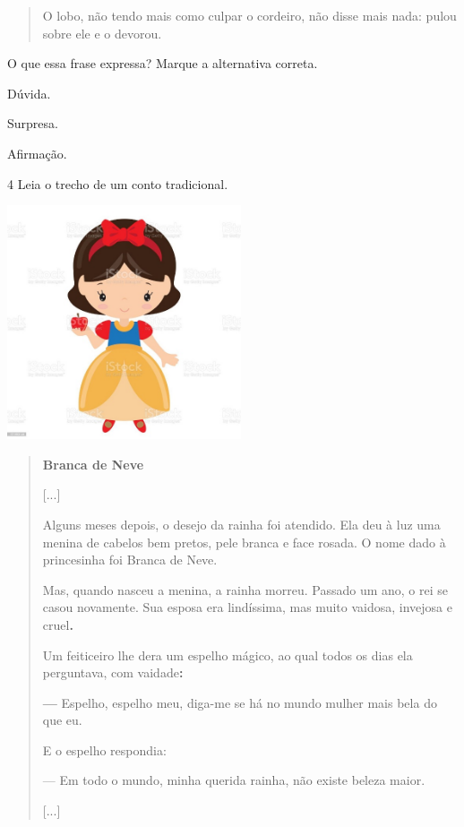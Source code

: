 \begin{quote}
O lobo, não tendo mais como culpar o cordeiro, não disse mais nada:
pulou sobre ele e o devorou.
\end{quote}

O que essa frase expressa? Marque a alternativa correta.

\begin{boxlist}
 Dúvida.

 Surpresa.

 Afirmação.
\end{boxlist}

\num{4} Leia o trecho de um conto tradicional.



\includegraphics[width=2.71875in,height=2.71875in]{./media/image6.jpeg}

\begin{quote}
\textbf{Branca de Neve}

{[}...{]}

Alguns meses depois, o desejo da rainha foi atendido. Ela deu à luz uma
menina de cabelos bem pretos, pele branca e face rosada. O nome dado à
princesinha foi Branca de Neve.

Mas, quando nasceu a menina, a rainha morreu. Passado um ano, o rei se
casou novamente. Sua esposa era lindíssima, mas muito vaidosa, invejosa
e cruel\textbf{.}

Um feiticeiro lhe dera um espelho mágico, ao qual todos os dias ela
perguntava, com vaidade\textbf{:}

\textbf{---} Espelho, espelho meu, diga-me se há no mundo mulher mais bela do que
eu.

E o espelho respondia:

--- Em todo o mundo, minha querida rainha, não existe beleza maior.

{[}...{]}

\end{quote}

